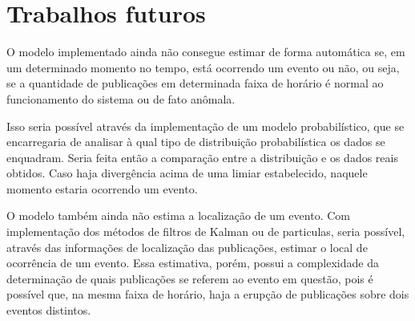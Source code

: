 \section{Trabalhos futuros}

O modelo implementado ainda não consegue estimar de forma automática se, em um determinado momento no tempo, está ocorrendo um evento ou não, ou seja, se a quantidade de publicações em determinada faixa de horário é normal ao funcionamento do sistema ou de fato anômala. 

Isso seria possível através da implementação de um modelo probabilístico, que se encarregaria de analisar à qual tipo de distribuição probabilística os dados se enquadram. Seria feita então a comparação entre a distribuição e os dados reais obtidos. Caso haja divergência acima de uma limiar estabelecido, naquele momento estaria ocorrendo um evento.

O modelo também ainda não estima a localização de um evento. Com implementação dos métodos de filtros de Kalman ou de particulas, seria possível, através das informações de localização das publicações, estimar o local de ocorrência de um evento. Essa estimativa, porém, possui a complexidade da determinação de quais publicações se referem ao evento em questão, pois é possível que, na mesma faixa de horário, haja a erupção de publicações sobre dois eventos distintos.
